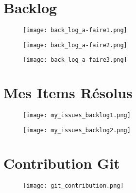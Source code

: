 \begin{appendices}
\section{Backlog}\label{appen:backlog}

\begin{figure}[!ht]
\centering
\texttt{[image: back\_log\_a-faire1.png]}
\end{figure}

\begin{figure}[!ht]
\centering
\texttt{[image: back\_log\_a-faire2.png]}
\end{figure}

\begin{figure}[!ht]
\centering
\texttt{[image: back\_log\_a-faire3.png]}
\end{figure}


\newpage
\section{Mes Items Résolus}\label{appen:my_backlog}
\begin{figure}[!ht]
\centering
\texttt{[image: my\_issues\_backlog1.png]}
\end{figure}

\begin{figure}[!ht]
\centering
\texttt{[image: my\_issues\_backlog2.png]}
\end{figure}

\newpage
\section{Contribution Git}\label{appen:git_contribution}
\begin{figure}[!ht]
\centering
\texttt{[image: git\_contribution.png]}
\end{figure}

\end{appendices}
